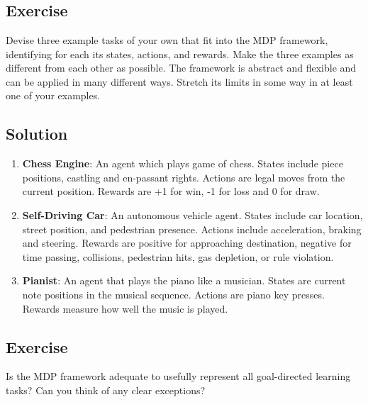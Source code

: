 \documentclass[11pt]{article}
\begin{document}
	
	\tableofcontents
	\newpage
	
	\setcounter{section}{2}
	\section{}
	
	\subsection{}
	\subsection*{Exercise}
	Devise three example tasks of your own that fit into the MDP framework,
	identifying for each its states, actions, and rewards. Make the three examples as different
	from each other as possible. The framework is abstract and flexible and can be applied in
	many different ways. Stretch its limits in some way in at least one of your examples.
	\subsection*{Solution}
	\begin{enumerate}
		\item \textbf{Chess Engine}: An agent which plays game of chess. States include piece positions, castling and en-passant rights. Actions are legal moves from the current position. Rewards are +1 for win, -1 for loss and 0 for draw.
		\item \textbf{Self-Driving Car}: An autonomous vehicle agent. States include car location, street position, and pedestrian presence. Actions include acceleration, braking and steering. Rewards are positive for approaching destination, negative for time passing, collisions, pedestrian hits, gas depletion, or rule violation.
		\item \textbf{Pianist}: An agent that plays the piano like a musician. States are current note positions in the musical sequence. Actions are piano key presses. Rewards measure how well the music is played.
	\end{enumerate}
	
	\subsection{}
	\subsection*{Exercise}
	Is the MDP framework adequate to usefully represent all goal-directed learning tasks? Can you think of any clear exceptions?
\end{document}
